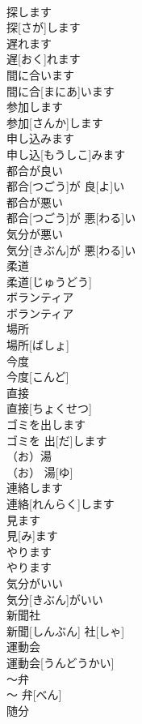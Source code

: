\documentclass[8pt]{extreport}
\begin{document}
\begin{CJK}{UTF8}{min}
\\	探します	
\\	探[さが]します	
\\	遅れます	
\\	遅[おく]れます	
\\	間に合います	
\\	間に合[まにあ]います	
\\	参加します	
\\	参加[さんか]します	
\\	申し込みます	
\\	申し込[もうしこ]みます	
\\	都合が良い	
\\	都合[つごう]が 良[よ]い	
\\	都合が悪い	
\\	都合[つごう]が 悪[わる]い	
\\	気分が悪い	
\\	気分[きぶん]が 悪[わる]い	
\\	柔道	
\\	柔道[じゅうどう]	
\\	ボランティア	
\\	ボランティア	
\\	場所	
\\	場所[ばしょ]	
\\	今度	
\\	今度[こんど]	
\\	直接	
\\	直接[ちょくせつ]	
\\	ゴミを出します	
\\	ゴミを 出[だ]します	
\\	（お）湯	
\\	（お） 湯[ゆ]	
\\	連絡します	
\\	連絡[れんらく]します	
\\	見ます	
\\	見[み]ます	
\\	やります	
\\	やります	
\\	気分がいい	
\\	気分[きぶん]がいい	
\\	新聞社	
\\	新聞[しんぶん] 社[しゃ]	
\\	運動会	
\\	運動会[うんどうかい]	
\\	〜弁	
\\	〜 弁[べん]	
\\	随分	

\end{CJK}
\end{document}
